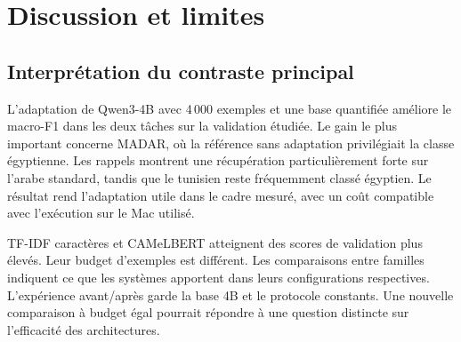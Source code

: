 \section{Discussion et limites}\label{sec:discussion}

\subsection{Interprétation du contraste principal}
L’adaptation de Qwen3-4B avec 4\,000 exemples et une base quantifiée améliore le macro-F1 dans les deux tâches sur la validation étudiée. Le gain le plus important concerne MADAR, où la référence sans adaptation privilégiait la classe égyptienne. Les rappels montrent une récupération particulièrement forte sur l’arabe standard, tandis que le tunisien reste fréquemment classé égyptien. Le résultat rend l’adaptation utile dans le cadre mesuré, avec un coût compatible avec l’exécution sur le Mac utilisé.

TF-IDF caractères et CAMeLBERT atteignent des scores de validation plus élevés. Leur budget d’exemples est différent. Les comparaisons entre familles indiquent ce que les systèmes apportent dans leurs configurations respectives. L’expérience avant/après garde la base 4B et le protocole constants. Une nouvelle comparaison à budget égal pourrait répondre à une question distincte sur l’efficacité des architectures.

